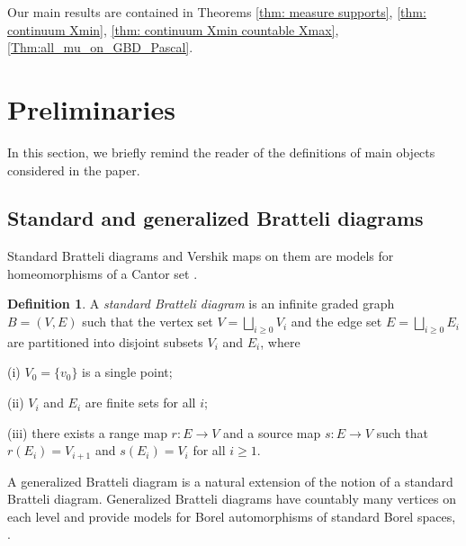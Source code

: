 \documentclass[11pt, twoside]{amsart}
\theoremstyle{definition}
\newtheorem{definition}{Definition}[section]
\theoremstyle{remark}
\theoremstyle{plain}
\numberwithin{equation}{section}
\begin{document}
Our main results are contained in Theorems \ref{thm: measure supports}, \ref{thm: continuum Xmin}, \ref{thm: continuum Xmin countable Xmax}, \ref{Thm:all_mu_on_GBD_Pascal}.



 

\section{Preliminaries}\label{Sect:prelim} 
In this section, we briefly remind the reader of the definitions  
of main objects considered in the paper. 

\subsection{Standard and generalized Bratteli diagrams}

Standard Bratteli diagrams and Vershik maps on them are models for 
homeomorphisms of a Cantor set \cite{HPS1992, Medynets2006, 
DownarowiczKarpel_2019}. 

\begin{definition}
A {\it standard Bratteli diagram} is an infinite graded graph $B=(V,E)$ such that the vertex
set $V =\bigsqcup_{i\geq 0}V_i$ and the edge set $E=\bigsqcup_{i\geq 0}E_i$
are partitioned into disjoint subsets $V_i$ and $E_i$, where

(i) $V_0=\{v_0\}$ is a single point;

(ii) $V_i$ and $E_i$ are finite sets for all $i$;

(iii) there exists a range map $r \colon E \rightarrow V$ and a source map $s \colon E \rightarrow V$ such that $r(E_i)= V_{i+1}$ and $s(E_i)= V_{i}$ for all $i \geq 1$.
\end{definition}

A generalized Bratteli diagram is a natural extension of the notion of a standard Bratteli diagram. Generalized Bratteli diagrams have countably many vertices on each level and provide models for Borel automorphisms of standard Borel spaces, \cite{BezuglyiDooleyKwiatkowski2006,
BezuglyiJorgensenSanadhya2024}.
\end{document}
